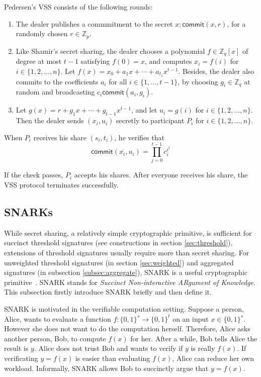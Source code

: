 Pedersen's VSS consists of the following rounds:

\begin{enumerate}
    \item The dealer publishes a commmitment to the secret $x: \mathsf{commit}(x, r)$, for a randomly chosen $r\in\mathbb{Z}_p$. 
    \item Like Shamir's secret sharing, the dealer chooses a polynomial $f\in \mathbb{Z}_q[x]$ of degree at most $t-1$ satisfying $f(0)=x$, and computes $x_i=f(i)$ for $i\in\{1,2,\dots, n\}$. Let $f(x) = x_0 + a_1 x + \cdots + a_{t_1} x^{t-1}$. Besides, the dealer also commits to the coefficients $a_i$ for all $i\in\{1,\dots, t-1\}$, by choosing $g_i\in \mathbb{Z}_q$ at random and broadcasting $c_i\mathsf{commit}(a_i, g_i)$. 
    \item Let $g(x)=r + g_1 x + \cdots + g_{t-1}x^{t-1}$, and let $u_i=g(i)$ for $i\in\{1,2,\dots, n\}$. Then the dealer sends $(x_i, u_i)$ secretly to participant $P_i$ for $i\in\{1,2,\dots, n\}$. 
\end{enumerate}

When $P_i$ receives his share $(s_i, t_i)$, he verifies that 
\begin{equation*}
    \mathsf{commit}(x_i, u_i) = \prod_{j=0}^{t-1} c_i^{i^j}
\end{equation*}  

If the check passes, $P_i$ accepts his shares. After everyone receives his share, the VSS protocol terminates successfully. 

\subsection{SNARKs}
While secret sharing, a relatively simple cryptographic primitive, is sufficient for succinct threshold signatures (see constructions in section \ref{sec:threshold}), extensions of threshold signatures usually require more than secret sharing. For unweighted threshold signatures (in section \ref{sec:weighted}) and aggregated signatures (in subsection \ref{subsec:aggregate}), SNARK is a useful cryptographic primitive~\cite{DBLP:conf/ccs/DasCXNB023}. SNARK stands for \textit{Succinct Non-interactive ARgument of Knowledge}. This subsection firstly introduce SNARK briefly and then define it. 

SNARK is motivated in the verifiable computation setting. Suppose a person, Alice, wants to evaluate a function $f:\{0,1\}^{s}\to \{0,1\}^t$ on an input $x\in \{0,1\}^s$. However she does not want to do the computation herself. Therefore, Alice asks another person, Bob, to compute $f(x)$ for her. After a while, Bob tells Alice the result is $y$. Alice does not trust Bob and wants to verify if $y$ is really $f(x)$. If verificating $y=f(x)$ is easier than evaluating $f(x)$, Alice can reduce her own workload. Informally, SNARK allows Bob to succinctly argue that $y=f(x)$. 


